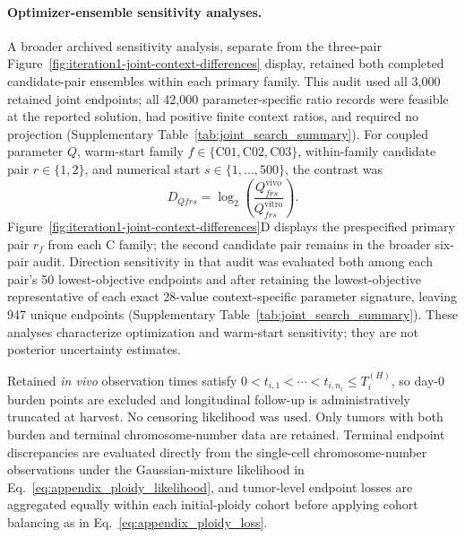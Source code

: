 \documentclass[11pt]{article}
\begin{document}
\paragraph{Optimizer-ensemble sensitivity analyses.}
A broader archived sensitivity analysis, separate from the three-pair Figure~\ref{fig:iteration1-joint-context-differences} display, retained both completed candidate-pair ensembles within each primary family. This audit used all 3,000 retained joint endpoints; all 42,000 parameter-specific ratio records were feasible at the reported solution, had positive finite context ratios, and required no projection (Supplementary Table~\ref{tab:joint_search_summary}). For coupled parameter $Q$, warm-start family $f\in\{\mathrm{C01},\mathrm{C02},\mathrm{C03}\}$, within-family candidate pair $r\in\{1,2\}$, and numerical start $s\in\{1,\ldots,500\}$, the contrast was
\begin{equation}
D_{Qfrs}=\log_2\!\left(\frac{Q^{\mathrm{vivo}}_{frs}}{Q^{\mathrm{vitro}}_{frs}}\right).
\label{eq:appendix_joint_family_log2_ratio}
\end{equation}
Figure~\ref{fig:iteration1-joint-context-differences}D displays the prespecified primary pair $r_f$ from each C family; the second candidate pair remains in the broader six-pair audit. Direction sensitivity in that audit was evaluated both among each pair's 50 lowest-objective endpoints and after retaining the lowest-objective representative of each exact 28-value context-specific parameter signature, leaving 947 unique endpoints (Supplementary Table~\ref{tab:joint_search_summary}). These analyses characterize optimization and warm-start sensitivity; they are not posterior uncertainty estimates.

Retained \textit{in vivo} observation times satisfy $0<t_{i,1}<\cdots<t_{i,n_i}\le T_i^{(H)}$, so day-0 burden points are excluded and longitudinal follow-up is administratively truncated at harvest. No censoring likelihood was used. Only tumors with both burden and terminal chromosome-number data are retained. Terminal endpoint discrepancies are evaluated directly from the single-cell chromosome-number observations under the Gaussian-mixture likelihood in Eq.~\eqref{eq:appendix_ploidy_likelihood}, and tumor-level endpoint losses are aggregated equally within each initial-ploidy cohort before applying cohort balancing as in Eq.~\eqref{eq:appendix_ploidy_loss}.
\end{document}
